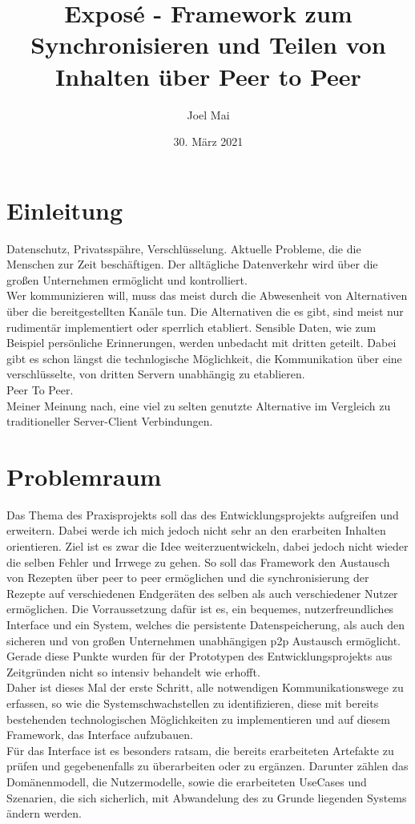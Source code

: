 \documentclass[10pt]{article}
\author{Joel Mai}
\title{Exposé - Framework zum Synchronisieren und Teilen von Inhalten über Peer to Peer}
\date{30. März 2021}
\begin{document}
    \maketitle 

    \newpage

    \section{Einleitung}\label{sec:Einleitung}
    Datenschutz, Privatsspähre, Verschlüsselung. Aktuelle Probleme, die die Menschen zur Zeit beschäftigen. Der alltägliche Datenverkehr wird über die großen Unternehmen ermöglicht und kontrolliert\cite{waandfb2021}. \\ 
    Wer kommunizieren will, muss das meist durch die Abwesenheit von Alternativen über die bereitgestellten Kanäle tun. Die Alternativen die es gibt, sind meist nur rudimentär implementiert oder sperrlich etabliert.
    Sensible Daten, wie zum Beispiel persönliche Erinnerungen, werden unbedacht mit dritten geteilt. Dabei gibt es schon längst die technlogische Möglichkeit, die Kommunikation über eine verschlüsselte, von dritten Servern unabhängig zu etablieren.\\ Peer To Peer.\\ Meiner Meinung nach, eine viel zu selten genutzte Alternative im Vergleich zu traditioneller Server-Client Verbindungen.

    \section{Problemraum}\label{sec:Problemraum}
    Das Thema des Praxisprojekts soll das des Entwicklungsprojekts\cite{cobanmai2021} aufgreifen und erweitern. Dabei werde ich mich jedoch nicht sehr an den erarbeiten Inhalten orientieren. Ziel ist es zwar die Idee weiterzuentwickeln, dabei jedoch nicht wieder die selben Fehler und Irrwege zu gehen. So soll das Framework den Austausch von Rezepten über peer to peer ermöglichen und die synchronisierung der Rezepte auf verschiedenen Endgeräten des selben als auch verschiedener Nutzer ermöglichen. Die Vorraussetzung dafür ist es, ein bequemes, nutzerfreundliches Interface und ein System, welches die persistente Datenspeicherung, als auch den sicheren und von großen Unternehmen unabhängigen p2p Austausch ermöglicht. \\
    Gerade diese Punkte wurden für der Prototypen des Entwicklungsprojekts aus Zeitgründen nicht so intensiv behandelt wie erhofft. \\
    Daher ist dieses Mal der erste Schritt, alle notwendigen Kommunikationswege zu erfassen, so wie die Systemschwachstellen zu identifizieren, diese mit bereits bestehenden technologischen Möglichkeiten zu implementieren und auf diesem Framework, das Interface aufzubauen. \\
    Für das Interface ist es besonders ratsam, die bereits erarbeiteten Artefakte zu prüfen und gegebenenfalls zu überarbeiten oder zu ergänzen. Darunter zählen das Domänenmodell, die Nutzermodelle, sowie die erarbeiteten UseCases und Szenarien, die sich sicherlich, mit Abwandelung des zu Grunde liegenden Systems ändern werden. \\
\end{document}
